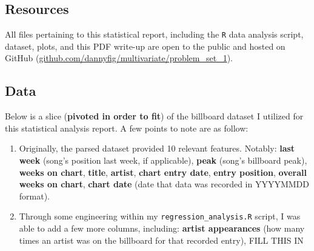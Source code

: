 \documentclass[11pt]{article} %
\begin{document}
\subsection*{Resources}
All files pertaining to this statistical report, including the \texttt{R} data analysis script, dataset, plots, and this PDF write-up are open to the public and hosted on GitHub (\href{https://github.com/dannyfig/MultivaRiate/tree/master/Problem_Set_1/}{\url{github.com/dannyfig/multivariate/problem_set_1}}).


\subsection*{Data}
Below is a slice (\textbf{pivoted in order to fit}) of the billboard dataset I utilized for this statistical analysis report. A few points to note are as follow:
\begin{enumerate}
	\item Originally, the parsed dataset provided 10 relevant features. Notably: \textbf{last week} (song's position last week, if applicable), \textbf{peak} (song's billboard peak), \textbf{weeks on chart}, \textbf{title}, \textbf{artist}, \textbf{chart entry date}, \textbf{entry position}, \textbf{overall weeks on chart}, \textbf{chart date} (date that data was recorded in YYYYMMDD format).
	\item Through some engineering within my \texttt{regression\_analysis.R} script, I was able to add a few more columns, including: \textbf{artist appearances} (how many times an artist was on the billboard for that recorded entry), FILL THIS IN
\end{enumerate}
\end{document}
